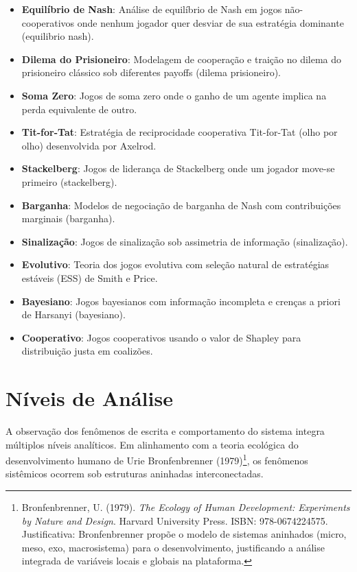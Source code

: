 \documentclass[12pt,a4paper,oneside]{abntex2}
\begin{document}
\begin{apendicesenv}
\begin{itemize}
    \item \textbf{Equilíbrio de Nash}: Análise de equilíbrio de Nash em jogos não-cooperativos onde nenhum jogador quer desviar de sua estratégia dominante (equilibrio nash).

    \item \textbf{Dilema do Prisioneiro}: Modelagem de cooperação e traição no dilema do prisioneiro clássico sob diferentes payoffs (dilema prisioneiro).

    \item \textbf{Soma Zero}: Jogos de soma zero onde o ganho de um agente implica na perda equivalente de outro.

    \item \textbf{Tit-for-Tat}: Estratégia de reciprocidade cooperativa Tit-for-Tat (olho por olho) desenvolvida por Axelrod.

    \item \textbf{Stackelberg}: Jogos de liderança de Stackelberg onde um jogador move-se primeiro (stackelberg).

    \item \textbf{Barganha}: Modelos de negociação de barganha de Nash com contribuições marginais (barganha).

    \item \textbf{Sinalização}: Jogos de sinalização sob assimetria de informação (sinalização).

    \item \textbf{Evolutivo}: Teoria dos jogos evolutiva com seleção natural de estratégias estáveis (ESS) de Smith e Price.

    \item \textbf{Bayesiano}: Jogos bayesianos com informação incompleta e crenças a priori de Harsanyi (bayesiano).

    \item \textbf{Cooperativo}: Jogos cooperativos usando o valor de Shapley para distribuição justa em coalizões.
\end{itemize}

\section{Níveis de Análise}

A observação dos fenômenos de escrita e comportamento do sistema integra múltiplos níveis analíticos. Em alinhamento com a teoria ecológica do desenvolvimento humano de Urie Bronfenbrenner (1979)\footnote{Bronfenbrenner, U. (1979). \textit{The Ecology of Human Development: Experiments by Nature and Design}. Harvard University Press. ISBN: 978-0674224575. Justificativa: Bronfenbrenner propõe o modelo de sistemas aninhados (micro, meso, exo, macrosistema) para o desenvolvimento, justificando a análise integrada de variáveis locais e globais na plataforma.}, os fenômenos sistêmicos ocorrem sob estruturas aninhadas interconectadas.


\end{apendicesenv}
\end{document}
